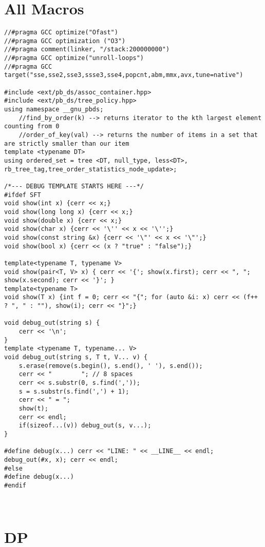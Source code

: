 \documentclass[FSZ,a4paper,onesided]{article}
\begin{document}
\begin{multicols*}{\COLS}
\tableofcontents
\newpage
{}


\section{All Macros}
\begin{lstlisting}
//#pragma GCC optimize("Ofast")
//#pragma GCC optimization ("O3")
//#pragma comment(linker, "/stack:200000000")
//#pragma GCC optimize("unroll-loops")
//#pragma GCC target("sse,sse2,sse3,ssse3,sse4,popcnt,abm,mmx,avx,tune=native")

#include <ext/pb_ds/assoc_container.hpp>
#include <ext/pb_ds/tree_policy.hpp>
using namespace __gnu_pbds;
    //find_by_order(k) --> returns iterator to the kth largest element counting from 0
    //order_of_key(val) --> returns the number of items in a set that are strictly smaller than our item
template <typename DT> 
using ordered_set = tree <DT, null_type, less<DT>, rb_tree_tag,tree_order_statistics_node_update>;

/*--- DEBUG TEMPLATE STARTS HERE ---*/
#ifdef SFT
void show(int x) {cerr << x;}
void show(long long x) {cerr << x;}
void show(double x) {cerr << x;}
void show(char x) {cerr << '\'' << x << '\'';}
void show(const string &x) {cerr << '\"' << x << '\"';}
void show(bool x) {cerr << (x ? "true" : "false");}

template<typename T, typename V>
void show(pair<T, V> x) { cerr << '{'; show(x.first); cerr << ", "; show(x.second); cerr << '}'; }
template<typename T>
void show(T x) {int f = 0; cerr << "{"; for (auto &i: x) cerr << (f++ ? ", " : ""), show(i); cerr << "}";}

void debug_out(string s) {
    cerr << '\n';
}
template <typename T, typename... V>
void debug_out(string s, T t, V... v) {
    s.erase(remove(s.begin(), s.end(), ' '), s.end());
    cerr << "        "; // 8 spaces
    cerr << s.substr(0, s.find(','));
    s = s.substr(s.find(',') + 1);
    cerr << " = ";
    show(t);
    cerr << endl;
    if(sizeof...(v)) debug_out(s, v...);
}

#define debug(x...) cerr << "LINE: " << __LINE__ << endl; debug_out(#x, x); cerr << endl;
#else
#define debug(x...)
#endif



\end{lstlisting}
\section{DP}

\end{multicols*}
\end{document}

